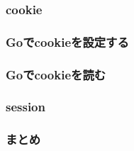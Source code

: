 
\subsubsection{cookie}

\subsubsection{Goでcookieを設定する}

\subsubsection{Goでcookieを読む}

\subsubsection{session}

\subsubsection{まとめ}

